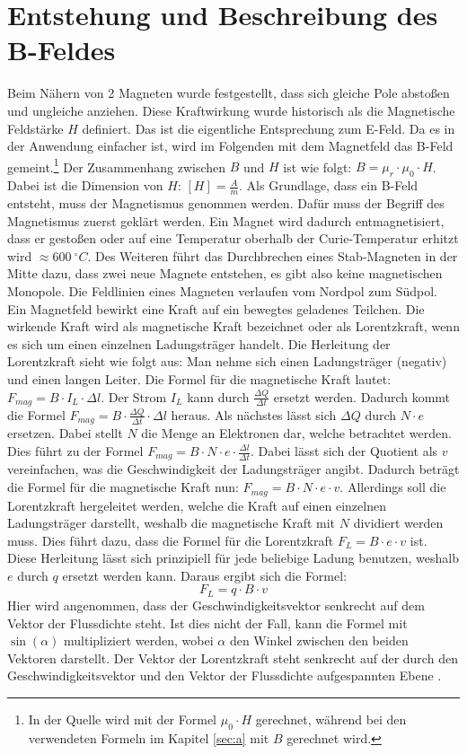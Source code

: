 \section{Entstehung und Beschreibung des B-Feldes}
Beim Nähern von 2 Magneten wurde festgestellt, dass sich gleiche Pole abstoßen und ungleiche anziehen.
Diese Kraftwirkung wurde historisch als die Magnetische Feldstärke $H$ definiert.
Das ist die eigentliche Entsprechung zum E-Feld.
Da es in der Anwendung einfacher ist, wird im Folgenden mit dem Magnetfeld das B-Feld gemeint.\footnote{In der Quelle \cite{Gente1950} wird mit der Formel $\mu_0 \cdot H$ gerechnet, während bei den verwendeten Formeln im Kapitel \ref{sec:a} mit $B$ gerechnet wird.}
Der Zusammenhang zwischen $B$ und $H$ ist wie folgt: $B = \mu_r \cdot \mu_0 \cdot H$.
Dabei ist die Dimension von $H$: $[H] = \frac{A}{m}$.
Als Grundlage, dass ein B-Feld entsteht, muss der Magnetismus genommen werden.
Dafür muss der Begriff des Magnetismus zuerst geklärt werden.
Ein Magnet wird dadurch entmagnetisiert, dass er gestoßen oder auf eine Temperatur oberhalb der Curie-Temperatur erhitzt wird $ \approx 600 ~ ^\circ C$.
Des Weiteren führt das Durchbrechen eines Stab-Magneten in der Mitte dazu, dass zwei neue Magnete entstehen, es gibt also keine magnetischen Monopole.
Die Feldlinien eines Magneten verlaufen vom Nordpol zum Südpol.
Ein Magnetfeld bewirkt eine Kraft auf ein bewegtes geladenes Teilchen.
Die wirkende Kraft wird als magnetische Kraft bezeichnet oder als Lorentzkraft, wenn es sich um einen einzelnen Ladungsträger handelt.
Die Herleitung der Lorentzkraft sieht wie folgt aus:
Man nehme sich einen Ladungsträger (negativ) und einen langen Leiter.
Die Formel für die magnetische Kraft lautet: $F_{mag} =  B \cdot I_L \cdot \Delta l$.
Der Strom $I_L$ kann durch $\frac{\Delta Q}{\Delta t}$ ersetzt werden.
Dadurch kommt die Formel $F_{mag} = B \cdot \frac{\Delta Q}{\Delta t} \cdot \Delta l$ heraus.
Als nächstes lässt sich $\Delta Q$ durch $N \cdot e$ ersetzen.
Dabei stellt $N$ die Menge an Elektronen dar, welche betrachtet werden.
Dies führt zu der Formel $F_{mag} = B \cdot N \cdot e \cdot \frac{\Delta l}{\Delta t}$.
Dabei lässt sich der Quotient als $v$ vereinfachen, was die Geschwindigkeit der Ladungsträger angibt.
Dadurch beträgt die Formel für die magnetische Kraft nun: $F_{mag} = B \cdot N \cdot e \cdot v$.
Allerdings soll die Lorentzkraft hergeleitet werden, welche die Kraft auf einen einzelnen Ladungsträger darstellt, weshalb die magnetische Kraft mit $N$ dividiert werden muss.
Dies führt dazu, dass die Formel für die Lorentzkraft $F_L = B \cdot e \cdot v$ ist.
Diese Herleitung lässt sich prinzipiell für jede beliebige Ladung benutzen, weshalb $e$ durch $q$ ersetzt werden kann.
Daraus ergibt sich die Formel:
\begin{equation*}
    F_L = q \cdot B \cdot v
\end{equation*}
Hier wird angenommen, dass der Geschwindigkeitsvektor senkrecht auf dem Vektor der Flussdichte steht.
Ist dies nicht der Fall, kann die Formel mit $\sin(\alpha)$ multipliziert werden, wobei $\alpha$ den Winkel zwischen den beiden Vektoren darstellt.
Der Vektor der Lorentzkraft steht senkrecht auf der durch den Geschwindigkeitsvektor und den Vektor der Flussdichte aufgespannten Ebene \cite{Lorentzkraft}.

